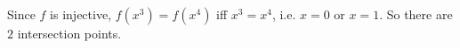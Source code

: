Since $f$ is injective, $f(x^3)=f(x^4)$ iff $x^3=x^4$, i.e. $x=0$ or $x=1$. So there are $\boxed{2}$ intersection points.
